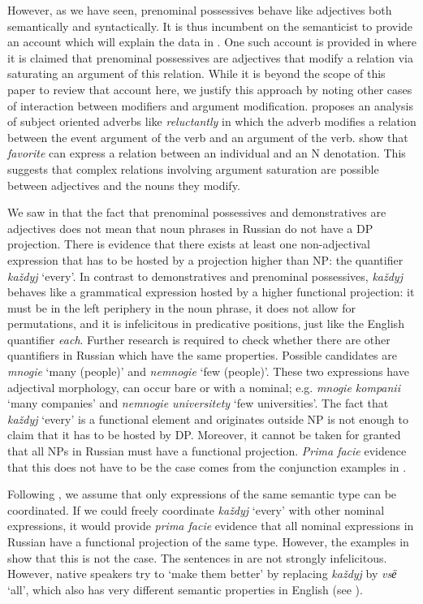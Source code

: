\documentclass[output=paper,
colorlinks,
citecolor=brown,
newtxmath
]{langscibook}
\begin{document}
However, as we have seen, prenominal possessives behave like adjectives both semantically and syntactically. It is thus incumbent on the semanticist to provide an account which will explain the data in . One such account is provided in \citet{Gepner2021a} where it is claimed that prenominal possessives are adjectives that modify a relation via saturating an argument of this relation. While it is beyond the scope of this paper to review that account here, we justify this approach by noting other cases of interaction between modifiers and argument modification. \citet{Landman2000} proposes an analysis of subject oriented adverbs like \textit{reluctantly} in which the adverb modifies a relation between the event argument of the verb and an argument of the verb. \citet{Partee.Borschev1999} show that \textit{favorite} can express a relation between an individual and an N denotation. This suggests that complex relations involving argument saturation are possible between adjectives and the nouns they modify.

We saw in  that the fact that prenominal possessives and demonstratives are adjectives does not mean that noun phrases in Russian do not have a DP projection. There is evidence that there exists at least one non-adjectival expression that has to be hosted by a projection higher than NP: the quantifier \textit{každyj} `every'. In contrast to demonstratives and prenominal possessives, \textit{každyj} behaves like a grammatical expression hosted by a higher functional projection: it must be in the left periphery in the noun phrase, it does not allow for permutations, and it is infelicitous in predicative positions, just like the English quantifier \textit{each}. Further research is required to check whether there are other quantifiers in Russian which have the same properties. Possible candidates are \textit{mnogie} `many (people)' and \textit{nemnogie} `few (people)'. These two expressions have adjectival morphology, can occur bare or with a nominal; e.g. \textit{mnogie kompanii} `many companies' and \textit{nemnogie universitety} `few universities'. 
The fact that \textit{každyj} `every' is a functional element and originates outside NP is not enough to claim that it has to be hosted by DP. Moreover, it cannot be taken for granted that all NPs in Russian must have a functional projection. \textit{Prima facie} evidence that this does not have to be the case comes from the conjunction examples in . 

Following \citet{Partee1987}, we assume that only expressions of the same semantic type can be coordinated. If we could freely coordinate \textit{každyj} `every' with other nominal expressions, it would provide \textit{prima facie} evidence that all nominal expressions in Russian have a functional projection of the same type. However, the examples in  show that this is not the case. The sentences in  are not strongly infelicitous. However, native speakers try to `make them better' by replacing \textit{každyj} by \textit{vsё} `all', which also has very different semantic properties in English (see \citealt{Dowty1987, Dowty.Brody1984}).
\end{document}
